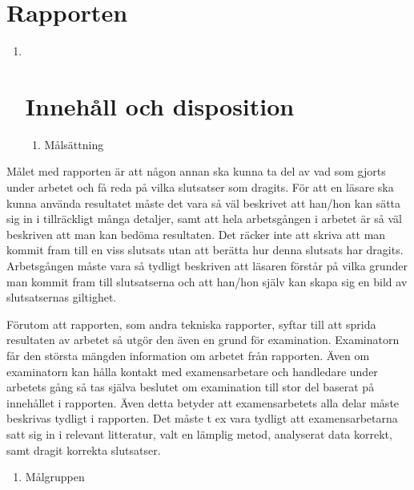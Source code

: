 \section{Rapporten }\label{rapporten}

\begin{enumerate}
\def\labelenumi{\arabic{enumi}.}
\item ~
  \section{Innehåll och disposition}\label{innehuxe5ll-och-disposition}

  \begin{enumerate}
  \def\labelenumii{\arabic{enumii}.}
  \item
    Målsättning
  \end{enumerate}
\end{enumerate}

Målet med rapporten är att någon annan ska kunna ta del av vad som
gjorts under arbetet och få reda på vilka slutsatser som dragits. För
att en läsare ska kunna använda resultatet måste det vara så väl
beskrivet att han/hon kan sätta sig in i tillräckligt många detaljer,
samt att hela arbetsgången i arbetet är så väl beskriven att man kan
bedöma resultaten. Det räcker inte att skriva att man kommit fram till
en viss slutsats utan att berätta hur denna slutsats har dragits.
Arbetsgången måste vara så tydligt beskriven att läsaren förstår på
vilka grunder man kommit fram till slutsatserna och att han/hon själv
kan skapa sig en bild av slutsatsernas giltighet.

Förutom att rapporten, som andra tekniska rapporter, syftar till att
sprida resultaten av arbetet så utgör den även en grund för examination.
Examinatorn får den största mängden information om arbetet från
rapporten. Även om examinatorn kan hålla kontakt med examensarbetare och
handledare under arbetets gång så tas själva beslutet om examination
till stor del baserat på innehållet i rapporten. Även detta betyder att
examensarbetets alla delar måste beskrivas tydligt i rapporten. Det
måste t ex vara tydligt att examensarbetarna satt sig in i relevant
litteratur, valt en lämplig metod, analyserat data korrekt, samt dragit
korrekta slutsatser.

\begin{enumerate}
\def\labelenumi{\arabic{enumi}.}
\item
  Målgruppen
\end{enumerate}

